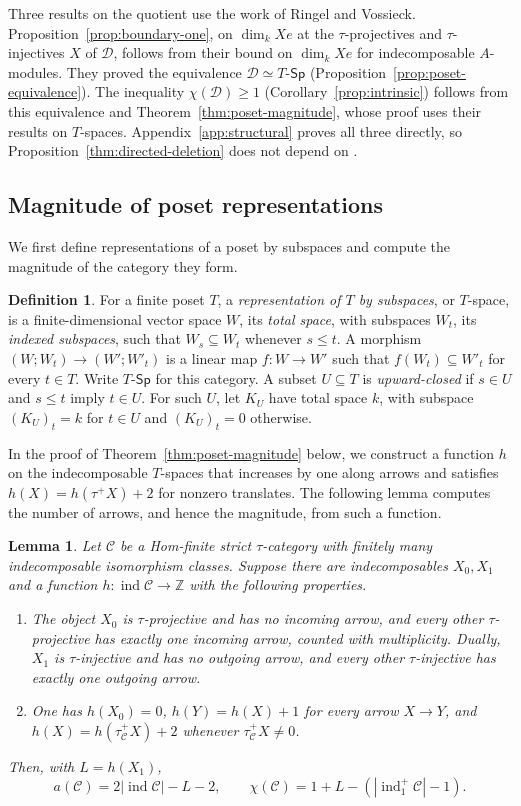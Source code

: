 \documentclass[a4paper,reqno,10pt]{amsart}
\newtheorem{lemma}[theorem]{Lemma}
\theoremstyle{definition}
\newtheorem{definition}[theorem]{Definition}
\numberwithin{equation}{section}
\DeclareMathOperator{\ind}{ind}
\newcommand{\cC}{\mathcal C}
\newcommand{\cD}{\mathcal D}
\newcommand{\TSp}{T\text{-}\mathsf{Sp}}
\begin{document}
Three results on the quotient use the work of Ringel and Vossieck.
Proposition~\ref{prop:boundary-one}, on \(\dim_k Xe\) at the
\(\tau\)-projectives and \(\tau\)-injectives \(X\) of \(\cD\), follows from
their bound on \(\dim_k Xe\) for indecomposable \(A\)-modules. They proved the equivalence
\(\cD\simeq\TSp\) (Proposition~\ref{prop:poset-equivalence}). The
inequality \(\chi(\cD)\geq1\) (Corollary~\ref{prop:intrinsic}) follows
from this equivalence and Theorem~\ref{thm:poset-magnitude}, whose proof
uses their results on \(T\)-spaces.
Appendix~\ref{app:structural} proves all three directly, so
Proposition~\ref{thm:directed-deletion} does not depend on \cite{RV}.

\subsection{Magnitude of poset representations}\label{subsec:poset}
We first define representations of a poset by subspaces and compute the
magnitude of the category they form.
\begin{definition}\label{def:t-space}
For a finite poset \(T\), a \emph{representation of \(T\) by subspaces},
or \(T\)-space, is a finite-dimensional vector space \(W\), its
\emph{total space}, with subspaces \(W_t\), its \emph{indexed subspaces},
such that \(W_s\subseteq W_t\) whenever \(s\leq t\).
A morphism \((W;W_t)\to(W';W'_t)\) is a linear map \(f:W\to W'\)
such that \(f(W_t)\subseteq W'_t\) for every \(t\in T\). Write
\(\TSp\) for this category. A subset \(U\subseteq T\) is
\emph{upward-closed} if \(s\in U\) and \(s\leq t\) imply \(t\in U\).
For such \(U\), let \(K_U\) have total space \(k\), with subspace
\((K_U)_t=k\) for \(t\in U\) and \((K_U)_t=0\) otherwise.
\end{definition}
In the proof of Theorem~\ref{thm:poset-magnitude} below, we construct a
function \(h\) on the indecomposable \(T\)-spaces that increases by one
along arrows and satisfies \(h(X)=h(\tau^+X)+2\) for nonzero translates.
The following lemma computes the number of arrows, and hence the
magnitude, from such a function.
\begin{lemma}\label{lem:height-arrows}
Let \(\cC\) be a Hom-finite strict \(\tau\)-category with finitely
many indecomposable isomorphism classes. Suppose there are
indecomposables \(X_0,X_1\) and a function
\(h:\ind\cC\to\mathbb Z\) with the following properties.
\begin{enumerate}
\item The object \(X_0\) is \(\tau\)-projective and has no incoming
arrow, and every other \(\tau\)-projective has exactly one incoming arrow,
counted with multiplicity. Dually, \(X_1\) is \(\tau\)-injective and has
no outgoing arrow, and every other \(\tau\)-injective has exactly one
outgoing arrow.
\item One has \(h(X_0)=0\), \(h(Y)=h(X)+1\) for every arrow
\(X\to Y\), and \(h(X)=h(\tau_{\cC}^+X)+2\) whenever
\(\tau_{\cC}^+X\ne0\).
\end{enumerate}
Then, with \(L=h(X_1)\),
\[
 a(\cC)=2|\ind\cC|-L-2,\qquad \chi(\cC)=1+L-(|\ind_1^+\cC|-1).
\]
\end{lemma}
\end{document}
